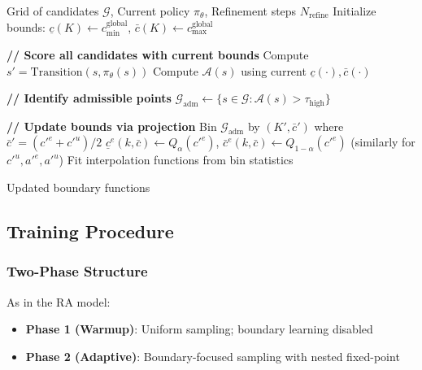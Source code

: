 \begin{algorithm}[H]
\caption{Boundary Refinement in High Dimensions}
\label{alg:boundary_hd}
\begin{algorithmic}[1]
\Require Grid of candidates $\mathcal{G}$, Current policy $\pi_\theta$, Refinement steps $N_{\text{refine}}$
\State Initialize bounds: $\underline{c}(K) \gets c_{\min}^{\text{global}}$, $\bar{c}(K) \gets c_{\max}^{\text{global}}$

    \State \textbf{// Score all candidates with current bounds}
        \State Compute $s' = \text{Transition}(s, \pi_\theta(s))$
        \State Compute $\mathcal{A}(s)$ using current $\underline{c}(\cdot), \bar{c}(\cdot)$
    \EndFor
    
    \State \textbf{// Identify admissible points}
    \State $\mathcal{G}_{\text{adm}} \gets \{s \in \mathcal{G} : \mathcal{A}(s) > \tau_{\text{high}}\}$
    
    \State \textbf{// Update bounds via projection}
    \State Bin $\mathcal{G}_{\text{adm}}$ by $(K', \bar{c}')$ where $\bar{c}' = (c'^e + c'^u)/2$
            \State $\underline{c}^e(k, \bar{c}) \gets Q_\alpha(c'^e)$, $\bar{c}^e(k, \bar{c}) \gets Q_{1-\alpha}(c'^e)$
            \State (similarly for $c'^u, a'^e, a'^u$)
        \EndIf
    \EndFor
    \State Fit interpolation functions from bin statistics
\EndFor

\State \Return Updated boundary functions
\end{algorithmic}
\end{algorithm}


\subsection{Training Procedure}

\subsubsection{Two-Phase Structure}
As in the RA model:
\begin{itemize}
    \item \textbf{Phase 1 (Warmup)}: Uniform sampling; boundary learning disabled
    \item \textbf{Phase 2 (Adaptive)}: Boundary-focused sampling with nested fixed-point
\end{itemize}

